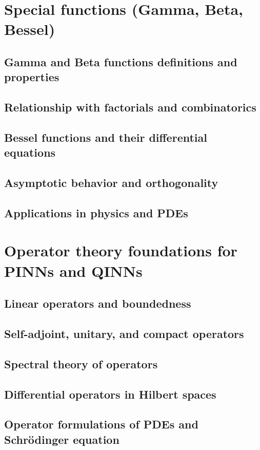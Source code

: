 \section{Special functions (Gamma, Beta, Bessel)}
\subsection{Gamma and Beta functions definitions and properties}
\subsection{Relationship with factorials and combinatorics}
\subsection{Bessel functions and their differential equations}
\subsection{Asymptotic behavior and orthogonality}
\subsection{Applications in physics and PDEs}

\section{Operator theory foundations for PINNs and QINNs}
\subsection{Linear operators and boundedness}
\subsection{Self-adjoint, unitary, and compact operators}
\subsection{Spectral theory of operators}
\subsection{Differential operators in Hilbert spaces}
\subsection{Operator formulations of PDEs and Schrödinger equation}

